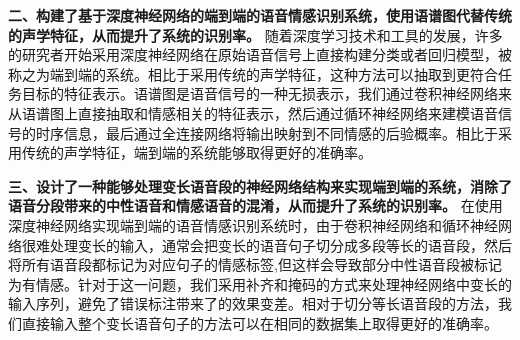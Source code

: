 \textbf{二、构建了基于深度神经网络的端到端的语音情感识别系统，使用语谱图代替传统的声学特征，从而提升了系统的识别率。} 随着深度学习技术和工具的发展，许多的研究者开始采用深度神经网络在原始语音信号上直接构建分类或者回归模型，被称之为端到端的系统。相比于采用传统的声学特征，这种方法可以抽取到更符合任务目标的特征表示。语谱图是语音信号的一种无损表示，我们通过卷积神经网络来从语谱图上直接抽取和情感相关的特征表示，然后通过循环神经网络来建模语音信号的时序信息，最后通过全连接网络将输出映射到不同情感的后验概率。相比于采用传统的声学特征，端到端的系统能够取得更好的准确率。

\textbf{三、设计了一种能够处理变长语音段的神经网络结构来实现端到端的系统，消除了语音分段带来的中性语音和情感语音的混淆，从而提升了系统的识别率。} 在使用深度神经网络实现端到端的语音情感识别系统时，由于卷积神经网络和循环神经网络很难处理变长的输入，通常会把变长的语音句子切分成多段等长的语音段，然后将所有语音段都标记为对应句子的情感标签,但这样会导致部分中性语音段被标记为有情感。针对于这一问题，我们采用补齐和掩码的方式来处理神经网络中变长的输入序列，避免了错误标注带来了的效果变差。相对于切分等长语音段的方法，我们直接输入整个变长语音句子的方法可以在相同的数据集上取得更好的准确率。





